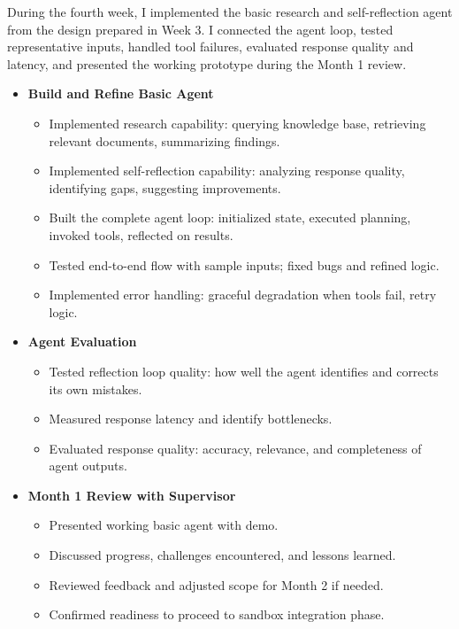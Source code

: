 
During the fourth week, I implemented the basic research and self-reflection agent from the design prepared in Week 3. I connected the agent loop, tested representative inputs, handled tool failures, evaluated response quality and latency, and presented the working prototype during the Month 1 review.


\begin{itemize}
    \item \textbf{Build and Refine Basic Agent}
    \begin{itemize}
        \item Implemented research capability: querying knowledge base, retrieving relevant documents, summarizing findings.
        \item Implemented self-reflection capability: analyzing response quality, identifying gaps, suggesting improvements.
        \item Built the complete agent loop: initialized state, executed planning, invoked tools, reflected on results.
        \item Tested end-to-end flow with sample inputs; fixed bugs and refined logic.
        \item Implemented error handling: graceful degradation when tools fail, retry logic.
    \end{itemize}

    \item \textbf{Agent Evaluation}
    \begin{itemize}
        \item Tested reflection loop quality: how well the agent identifies and corrects its own mistakes.
        \item Measured response latency and identify bottlenecks.
        \item Evaluated response quality: accuracy, relevance, and completeness of agent outputs.
    \end{itemize}

    \item \textbf{Month 1 Review with Supervisor}
    \begin{itemize}
        \item Presented working basic agent with demo.
        \item Discussed progress, challenges encountered, and lessons learned.
        \item Reviewed feedback and adjusted scope for Month 2 if needed.
        \item Confirmed readiness to proceed to sandbox integration phase.
    \end{itemize}
\end{itemize}

